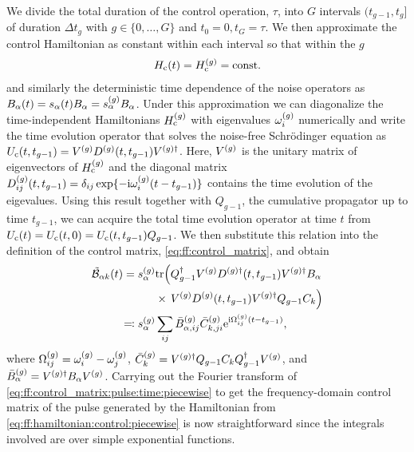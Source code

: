 We divide the total duration of the control operation, $\tau$, into $G$ intervals $(t_{g-1}, t_{g}]$ of duration $\Delta t_g$ with $g\in\lbrace 0,\dotsc,G\rbrace$ and $t_0 =  0, t_G = \tau$.
We then approximate the control Hamiltonian as constant within each interval so that within the $g$
\begin{align}\label{eq:ff:hamiltonian:control:piecewise}
    H_{\mathrm{c}}(t) = H_{\mathrm{c}}^{(g)} = \mathrm{const.}
\end{align}
and similarly the deterministic time dependence of the noise operators as $B_\alpha(t) = s_\alpha(t)B_\alpha = s_\alpha^{(g)}B_\alpha$.
Under this approximation we can diagonalize the time-independent Hamiltonians $H_{\mathrm{c}}^{(g)}$ with eigenvalues $\omega_i^{(g)}$ numerically and write the time evolution operator that solves the noise-free Schr\"odinger equation as $U_{\mathrm{c}}(t, t_{g-1}) = V^{(g)} D^{(g)}(t, t_{g-1})V^{(g)\dagger}$.
Here, $V^{(g)}$ is the unitary matrix of eigenvectors of $H_{\mathrm{c}}^{(g)}$ and the diagonal matrix $D_{ij}^{(g)}(t, t_{g-1}) = \delta_{ij}\exp\{-\mathrm{i}\omega_i^{(g)}(t - t_{g-1})\}$ contains the time evolution of the eigevalues.
Using this result together with $Q_{g-1}$, the cumulative propagator up to time $t_{g-1}$, we can acquire the total time evolution operator at time $t$ from $U_{\mathrm{c}}(t) = U_{\mathrm{c}}(t,0) = U_{\mathrm{c}}(t, t_{g-1}) Q_{g-1}$.
We then substitute this relation into the definition of the control matrix, \cref{eq:ff:control_matrix}, and obtain
\begin{align}
    \tilde{\mathcal{B}}_{\alpha k}(t) = s_\alpha^{(g)}&\mathrm{tr}\Bigl(Q_{g-1}^\dagger V^{(g)} D^{(g)\dagger}(t, t_{g-1}) V^{(g)\dagger} B_\alpha \notag\\
                                            &      \times\,V^{(g)} D^{(g)}(t, t_{g-1})V^{(g)\dagger} Q_{g-1} C_k\Bigr) \\
                   \eqqcolon s_\alpha^{(g)}&\sum_{ij}\bar{B}_{\alpha,ij}^{(g)}\bar{C}_{k,ji}^{(g)}
                                   \mathrm{e}^{\mathrm{i}\Omega_{ij}^{(g)}(t - t_{g-1})}, \label{eq:ff:control_matrix:pulse:time:piecewise}
\end{align}
where $\Omega_{ij}^{(g)} = \omega_i^{(g)} - \omega_j^{(g)}$, $\bar{C}_{k}^{(g)} = V^{(g)\dagger} Q_{g-1} C_k Q_{g-1}^\dagger V^{(g)}$, and $\bar{B}_{\alpha}^{(g)} = V^{(g)\dagger} B_\alpha V^{(g)}$.
Carrying out the Fourier transform of \cref{eq:ff:control_matrix:pulse:time:piecewise} to get the frequency-domain control matrix of the pulse generated by the Hamiltonian from \cref{eq:ff:hamiltonian:control:piecewise} is now straightforward since the integrals involved are over simple exponential functions.
